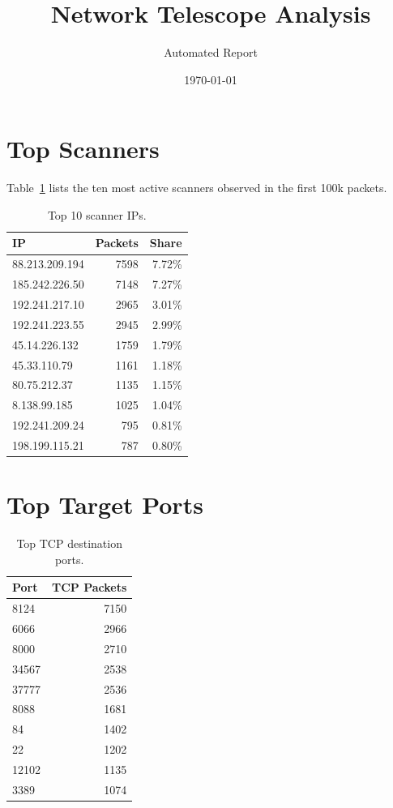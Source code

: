 \documentclass{article}
\begin{document}
\title{Network Telescope Analysis}
\author{Automated Report}
\date{\today}
\maketitle

\section{Top Scanners}
Table~\ref{tab:scanners} lists the ten most active scanners observed in the first 100k packets.

\begin{table}[h]
\centering
\begin{tabular}{lrr}
IP & Packets & Share\\\hline
88.213.209.194 & 7598 & 7.72\%\\
185.242.226.50 & 7148 & 7.27\%\\
192.241.217.10 & 2965 & 3.01\%\\
192.241.223.55 & 2945 & 2.99\%\\
45.14.226.132 & 1759 & 1.79\%\\
45.33.110.79 & 1161 & 1.18\%\\
80.75.212.37 & 1135 & 1.15\%\\
8.138.99.185 & 1025 & 1.04\%\\
192.241.209.24 & 795 & 0.81\%\\
198.199.115.21 & 787 & 0.80\%\\
\end{tabular}
\caption{Top 10 scanner IPs.}
\label{tab:scanners}
\end{table}

\section{Top Target Ports}
\begin{table}[h]
\centering
\begin{tabular}{lr}
Port & TCP Packets\\\hline
8124 & 7150\\
6066 & 2966\\
8000 & 2710\\
34567 & 2538\\
37777 & 2536\\
8088 & 1681\\
84 & 1402\\
22 & 1202\\
12102 & 1135\\
3389 & 1074\\
\end{tabular}
\caption{Top TCP destination ports.}
\end{table}
\end{document}
